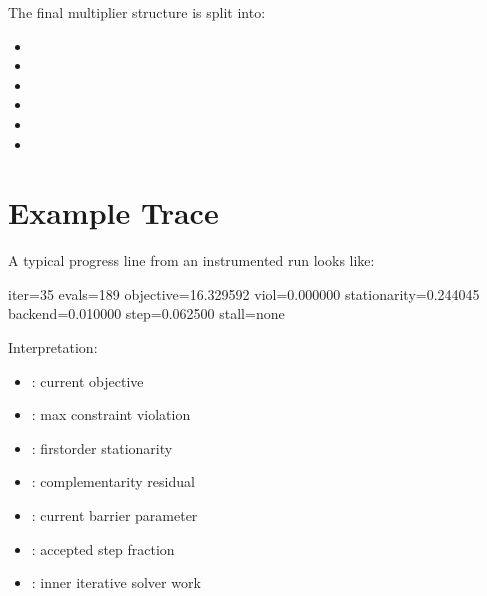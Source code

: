 \documentclass[letterpaper,10pt,english]{sphinxmanual}
\begin{document}
\sphinxAtStartPar
The final multiplier structure is split into:
\begin{itemize}
\item {} 
\sphinxAtStartPar
{}

\item {} 
\sphinxAtStartPar
{}

\item {} 
\sphinxAtStartPar
{}

\item {} 
\sphinxAtStartPar
{}

\item {} 
\sphinxAtStartPar
{}

\item {} 
\sphinxAtStartPar
{}

\end{itemize}


\section{Example Trace}
\label{\detokenize{optima_internal_protocol:example-trace}}
\sphinxAtStartPar
A typical progress line from an instrumented run looks like:

\begin{sphinxVerbatim}[commandchars=\\\{\}]
iter=35 evals=189 objective=16.329592 viol=0.000000 stationarity=0.244045 backend=0.010000 step=0.062500 stall=none
\end{sphinxVerbatim}

\sphinxAtStartPar
Interpretation:
\begin{itemize}
\item {} 
\sphinxAtStartPar
{}: current objective

\item {} 
\sphinxAtStartPar
{}: max constraint violation

\item {} 
\sphinxAtStartPar
{}: first\sphinxhyphen{}order stationarity

\item {} 
\sphinxAtStartPar
{}: complementarity residual

\item {} 
\sphinxAtStartPar
{}: current barrier parameter

\item {} 
\sphinxAtStartPar
{}: accepted step fraction

\item {} 
\sphinxAtStartPar
{}: inner iterative solver work

\end{itemize}
\end{document}
